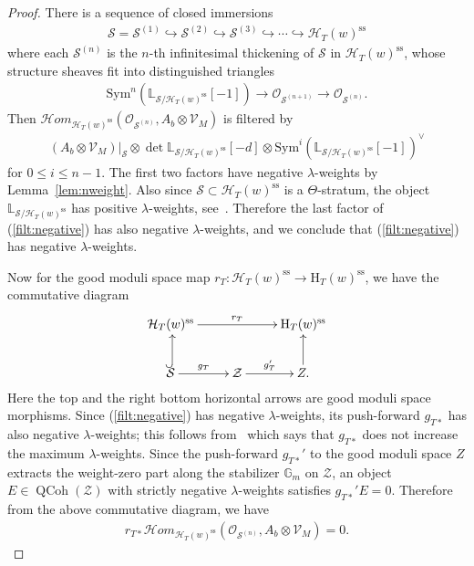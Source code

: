 \documentclass[11pt,oneside,a4paper,mathscr]{amsart}
\makeatletter
\theoremstyle{definition}
\renewcommand{\leq}{\leqslant}
\newcommand{\cS}{\mathcal{S}}
\newcommand{\QCoh}{\operatorname{QCoh}}
\newcommand{\cH}{\mathcal{H}}
\newcommand{\cHom}{\mathcal{H}om}
\newcommand{\uinclusion}{\ar@<-0.3ex>@{^{(}->}[u]}
\makeatother
\begin{document}
\begin{proof}
There is a sequence of closed immersions 
\begin{align*}
   \cS=\cS^{(1)} \hookrightarrow \cS^{(2)} \hookrightarrow \cS^{(3)} \hookrightarrow 
    \cdots \hookrightarrow \cH_T(w)^{\mathrm{ss}}
\end{align*}
where each $\cS^{(n)}$ is the $n$-th infinitesimal thickening of $\cS$ in $\cH_T(w)^{\mathrm{ss}}$, 
whose structure sheaves fit into distinguished triangles 
\begin{align*}
    \mathrm{Sym}^{n}(\mathbb{L}_{\cS/\cH_T(w)^{\mathrm{ss}}}[-1]) \to \mathcal{O}_{\cS^{(n+1)}} \to \mathcal{O}_{\cS^{(n)}}.
\end{align*}
Then $\cHom_{\cH_T(w)^{\mathrm{ss}}}(\mathcal{O}_{\cS^{(n)}}, A_b \otimes \mathcal{V}_M)$ is filtered by 
\begin{align}\label{filt:negative}
(A_b \otimes \mathcal{V}_M)|_{\cS} \otimes \det \mathbb{L}_{\cS/\cH_T(w)^{\mathrm{ss}}}[-d]\otimes\mathrm{Sym}^i(\mathbb{L}_{\cS/\cH_T(w)^{\mathrm{ss}}}[-1])^{\vee}  
\end{align}
for $0\leq i\leq n-1$. The first two factors have negative 
$\lambda$-weights by Lemma~\ref{lem:nweight}. Also since $\cS \subset \cH_T(w)^{\mathrm{ss}}$ is a $\Theta$-stratum, the object 
$\mathbb{L}_{\cS/\cH_T(w)^{\mathrm{ss}}}$ has positive $\lambda$-weights, 
see~\cite[Lemma~1.3.2]{HalpK32}. Therefore the last factor of (\ref{filt:negative}) has also negative $\lambda$-weights, and 
we conclude that (\ref{filt:negative}) has negative 
$\lambda$-weights. 

Now for the good moduli space map 
$r_T \colon \cH_T(w)^{\mathrm{ss}} \to \mathrm{H}_T(w)^{\mathrm{ss}}$, we have 
the commutative diagram 
\begin{align*}
    \xymatrix{
    \cH_T(w)^{\mathrm{ss}} \ar[rr]^-{r_T} & &\mathrm{H}_T(w)^{\mathrm{ss}} \\
    \cS \uinclusion \ar[r]^-{g_T} & \mathcal{Z} \ar[r]^-{g_T'} & Z. \ar[u]
    }
\end{align*}
Here the top and the right bottom horizontal arrows are good moduli space morphisms.  
Since (\ref{filt:negative}) has negative $\lambda$-weights, 
its push-forward $g_{T*}$ has also negative $\lambda$-weights; this follows from~\cite[Lemma~1.5.6]{HalpK32} which says that $g_{T*}$ does not increase the maximum $\lambda$-weights. 
Since the push-forward $g_{T*}'$ to the good moduli space $Z$ extracts the weight-zero
part along the stabilizer $\mathbb G_m$ on $\mathcal{Z}$, an object 
$E \in \QCoh(\mathcal{Z})$ with strictly negative $\lambda$-weights satisfies $g_{T*}'E=0$. 
Therefore from the above commutative diagram, we have 
\begin{align}\label{vanish:rt}
    r_{T*}\cHom_{\cH_T(w)^{\mathrm{ss}}}(\mathcal{O}_{\cS^{(n)}}, A_b \otimes \mathcal{V}_M)=0. 
\end{align}


\end{proof}
\end{document}
